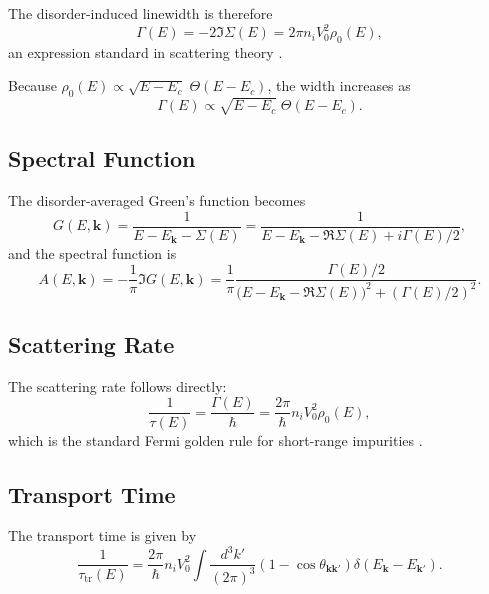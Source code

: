 The disorder-induced linewidth is therefore
\begin{equation}
\Gamma(E) = -2 \Im \Sigma(E)
           = 2\pi n_i V_0^2 \rho_0(E),
\end{equation}
an expression standard in scattering theory \cite{Mahan2000}.

Because $\rho_0(E) \propto \sqrt{E - E_c} \;\Theta(E - E_c)$, the width increases as
\begin{equation}
\Gamma(E) \propto \sqrt{E - E_c} \;\Theta(E - E_c).
\end{equation}

\subsection{Spectral Function}

The disorder-averaged Green's function becomes
\begin{equation}
G(E,\mathbf{k}) = 
\frac{1}{E - E_{\mathbf{k}} -\Sigma(E)} = 
\frac{1}{E - E_{\mathbf{k}} - \Re\Sigma(E) + i \Gamma(E)/2},
\end{equation}
and the spectral function is \cite{Mahan2000}
\begin{equation}
A(E,\mathbf{k}) = 
-\frac{1}{\pi}\Im G(E,\mathbf{k})
= \frac{1}{\pi}
\frac{\Gamma(E)/2}{
       \big(E - E_{\mathbf{k}} - \Re\Sigma(E)\big)^2
     + (\Gamma(E)/2)^2 }.
\end{equation}

\subsection{Scattering Rate}

The scattering rate follows directly:
\begin{equation}
\frac{1}{\tau(E)} = \frac{\Gamma(E)}{\hbar}
 = \frac{2\pi}{\hbar} n_i V_0^2 \rho_0(E),
\end{equation}
which is the standard Fermi golden rule for short-range impurities \cite{Mahan2000,Kittel2005}.

\subsection{Transport Time}

The transport time is given by \cite{Mahan2000}
\begin{equation}
\frac{1}{\tau_{\mathrm{tr}}(E)} =
\frac{2\pi}{\hbar} n_i V_0^2
\int \frac{d^3 k'}{(2\pi)^3}
(1 - \cos\theta_{\mathbf{k}\mathbf{k}'})
\delta(E_{\mathbf{k}} - E_{\mathbf{k}'}).
\end{equation}

